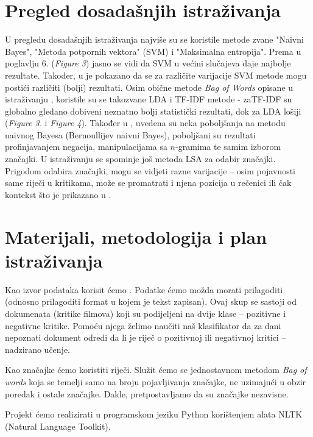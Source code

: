 \documentclass[12pt,a4paper,titlepage]{article}
\begin{document}
\section{Pregled dosadašnjih istraživanja}

U pregledu dosadašnjih istraživanja najviše su se koristile metode zvane "Naivni Bayes", "Metoda potpornih vektora" (\textsc{SVM}) i "Maksimalna entropija". Prema \cite{Pang:2002:TUS:1118693.1118704} u poglavlju 6. (\textit{Figure 3}) jasno se vidi da \textsc{SVM} u većini slučajeva daje najbolje rezultate. Također, u \cite{stan} je pokazano da se za različite varijacije \textsc{SVM} metode mogu postići različiti (bolji) rezultati. Osim obične metode \textit{Bag of Words} opisane u istraživanju \cite{stan}, koristile su se takozvane \textsc{LDA} i \textsc{TF-IDF} metode - za\textsc{TF-IDF} su globalno gledano dobiveni neznatno bolji statistički rezultati, dok za \textsc{LDA} lošiji (\textit{Figure 3.} i \textit{Figure 4}). Također u \cite{SaLAD:LAS}, uvedena su neka poboljšanja na metodu naivnog Bayesa (Bernoullijev naivni Bayes), poboljšani su rezultati profinjavanjem negacija, manipulacijama sa $n$-gramima te samim izborom značajki. U istraživanju \cite{maas-EtAl:2011:ACL-HLT2011} se spominje još metoda \textsc{LSA} za odabir značajki. Prigodom odabira značajki, mogu se vidjeti razne varijacije -- osim pojavnosti same riječi u kritikama, može se promatrati i njena pozicija u rečenici ili čak kontekst što je prikazano u \cite{Pang:2002:TUS:1118693.1118704}.

\section{Materijali, metodologija i plan istraživanja}

Kao izvor podataka korisit ćemo \cite{dataset}. Podatke ćemo možda morati prilagoditi (odnosno prilagoditi format u kojem je tekst zapisan). Ovaj skup se sastoji od dokumenata (kritike filmova) koji su podijeljeni na dvije klase -- pozitivne i negativne kritike. Pomoću njega želimo naučiti naš klasifikator da za dani nepoznati dokument odredi da li je riječ o pozitivnoj ili negativnoj kritici -- nadzirano učenje.

Kao značajke ćemo koristiti riječi. Služit ćemo se jednostavnom metodom \textit{Bag of words} koja se temelji samo na broju pojavljivanja značajke, ne uzimajući u obzir poredak i ostale značajke. Dakle, pretpostavljamo da su značajke nezavisne.

Projekt ćemo realizirati u programskom jeziku Python korištenjem alata NLTK (Natural Language Toolkit). 
\end{document}

